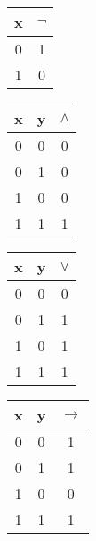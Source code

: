 \begin{figure}[h!]
    \label{table:BackgroundLogicalOperators}
    \centering
    \begin{minipage}{.18\textwidth}
        \centering
        \begin{tabular}{|c|c|}
        \hline
        x & $\lnot$ \\
        \hline
        0 & 1\\
        \hline
        1 & 0\\
        \hline
        \end{tabular}
        \vspace{0.96cm}
    \end{minipage}%
    \begin{minipage}{.18\textwidth}
        \centering
        \begin{tabular}{|c|c|c|}
            \hline
            x & y & $\land$ \\
            \hline
            0 & 0 & 0\\
            \hline
            0 & 1 & 0\\
            \hline
            1 & 0 & 0\\
            \hline
            1 & 1 & 1\\
            \hline
            \end{tabular}
    \end{minipage}
    \begin{minipage}{.18\textwidth}
        \centering
        \begin{tabular}{|c|c|c|}
            \hline
            x & y & $\lor$ \\
            \hline
            0 & 0 & 0\\
            \hline
            0 & 1 & 1\\
            \hline
            1 & 0 & 1\\
            \hline
            1 & 1 & 1\\
            \hline
            \end{tabular}
    \end{minipage}
    \begin{minipage}{.18\textwidth}
        \centering
        \begin{tabular}{|c|c|c|}
            \hline
            x & y & $\rightarrow$ \\
            \hline
            0 & 0 & 1\\
            \hline
            0 & 1 & 1\\
            \hline
            1 & 0 & 0\\
            \hline
            1 & 1 & 1\\
            \hline
            \end{tabular}
    \end{minipage}
\end{figure}



